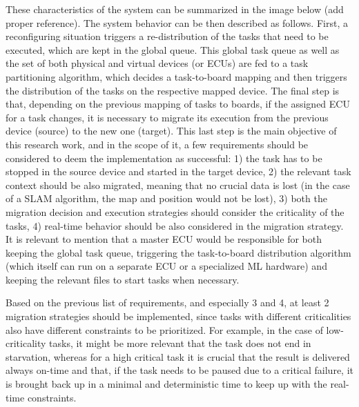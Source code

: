 These characteristics of the system can be summarized in the image below (add proper reference). The system behavior can be then described as follows. First, a reconfiguring situation triggers a re-distribution of the tasks that need to be executed, which are kept in the global queue. This global task queue as well as the set of both physical and virtual devices (or ECUs) are fed to a task partitioning algorithm, which decides a task-to-board mapping and then triggers the distribution of the tasks on the respective mapped device. The final step is that, depending on the previous mapping of tasks to boards, if the assigned ECU for a task changes, it is necessary to migrate its execution from the previous device (source) to the new one (target). This last step is the main objective of this research work, and in the scope of it, a few requirements should be considered to deem the implementation as successful: 1) the task has to be stopped in the source device and started in the target device, 2) the relevant task context should be also migrated, meaning that no crucial data is lost (in the case of a SLAM algorithm, the map and position would not be lost), 3) both the migration decision and execution strategies should consider the criticality of the tasks, 4) real-time behavior should be also considered in the migration strategy. It is relevant to mention that a master ECU would be responsible for both keeping the global task queue, triggering the task-to-board distribution algorithm (which itself can run on a separate ECU or a specialized ML hardware) and keeping the relevant files to start tasks when necessary.
 

\begin{center}
\end{center}

Based on the previous list of requirements, and especially 3 and 4, at least 2 migration strategies should be implemented, since tasks with different criticalities also have different constraints to be prioritized. For example, in the case of low-criticality tasks, it might be more relevant that the task does not end in starvation, whereas for a high critical task it is crucial that the result is delivered always on-time and that, if the task needs to be paused due to a critical failure, it is brought back up in a minimal and deterministic time to keep up with the real-time constraints.

